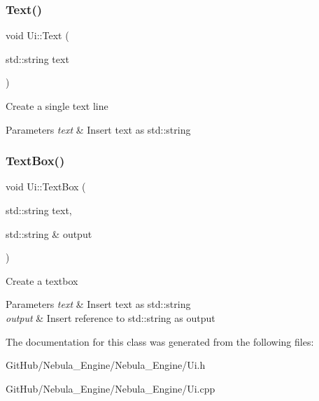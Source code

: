 \subsubsection{\texorpdfstring{Text()}{Text()}}
{\footnotesize\ttfamily void Ui\+::\+Text (\begin{DoxyParamCaption}\item[{std\+::string}]{text }\end{DoxyParamCaption})}

Create a single text line 
\begin{DoxyParams}{Parameters}
{\em text} & Insert text as std\+::string \\
\hline
\end{DoxyParams}
\mbox{\label{class_ui_a6ddbf246b6af53e4de87b93a449ff7fd}} 
\subsubsection{\texorpdfstring{TextBox()}{TextBox()}}
{\footnotesize\ttfamily void Ui\+::\+Text\+Box (\begin{DoxyParamCaption}\item[{std\+::string}]{text,  }\item[{std\+::string \&}]{output }\end{DoxyParamCaption})}

Create a textbox 
\begin{DoxyParams}{Parameters}
{\em text} & Insert text as std\+::string \\
\hline
{\em output} & Insert reference to std\+::string as output \\
\hline
\end{DoxyParams}


The documentation for this class was generated from the following files\+:\begin{DoxyCompactItemize}
\item 
Git\+Hub/\+Nebula\+\_\+\+Engine/\+Nebula\+\_\+\+Engine/Ui.\+h\item 
Git\+Hub/\+Nebula\+\_\+\+Engine/\+Nebula\+\_\+\+Engine/Ui.\+cpp\end{DoxyCompactItemize}
